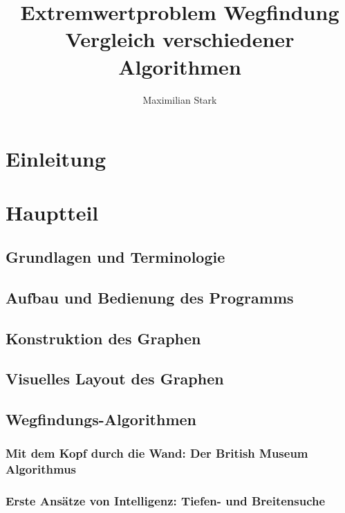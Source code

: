 \documentclass[12pt]{article}
\begin{document}
\title{Extremwertproblem Wegfindung \\  \large{\enspace Vergleich verschiedener Algorithmen}}

\author{Maximilian Stark}

\maketitle
\thispagestyle{empty}
\clearpage

\tableofcontents
\clearpage

\section{Einleitung}
\newpage

\section{Hauptteil}
\newpage

\subsection{Grundlagen und Terminologie}
\newpage

\subsection{Aufbau und Bedienung des Programms}
\newpage

\subsection{Konstruktion des Graphen}
\newpage

\subsection{Visuelles Layout des Graphen}
\newpage

\subsection{Wegfindungs-Algorithmen}
\newpage

\subsubsection{Mit dem Kopf durch die Wand: Der British Museum Algorithmus}
\newpage

\subsubsection{Erste Ansätze von Intelligenz: Tiefen- und Breitensuche}
\newpage
\end{document}

